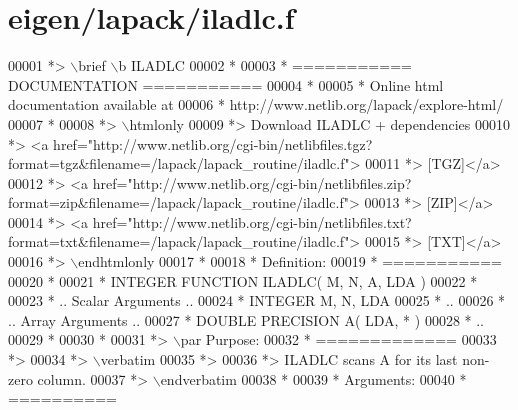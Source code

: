 \hypertarget{eigen_2lapack_2iladlc_8f_source}{}\section{eigen/lapack/iladlc.f}
\label{eigen_2lapack_2iladlc_8f_source}

\begin{DoxyCode}
00001 \textcolor{comment}{*> \(\backslash\)brief \(\backslash\)b ILADLC}
00002 \textcolor{comment}{*}
00003 \textcolor{comment}{*  =========== DOCUMENTATION ===========}
00004 \textcolor{comment}{*}
00005 \textcolor{comment}{* Online html documentation available at }
00006 \textcolor{comment}{*            http://www.netlib.org/lapack/explore-html/ }
00007 \textcolor{comment}{*}
00008 \textcolor{comment}{*> \(\backslash\)htmlonly}
00009 \textcolor{comment}{*> Download ILADLC + dependencies }
00010 \textcolor{comment}{*> <a
       href="http://www.netlib.org/cgi-bin/netlibfiles.tgz?format=tgz&filename=/lapack/lapack\_routine/iladlc.f"> }
00011 \textcolor{comment}{*> [TGZ]</a> }
00012 \textcolor{comment}{*> <a
       href="http://www.netlib.org/cgi-bin/netlibfiles.zip?format=zip&filename=/lapack/lapack\_routine/iladlc.f"> }
00013 \textcolor{comment}{*> [ZIP]</a> }
00014 \textcolor{comment}{*> <a
       href="http://www.netlib.org/cgi-bin/netlibfiles.txt?format=txt&filename=/lapack/lapack\_routine/iladlc.f"> }
00015 \textcolor{comment}{*> [TXT]</a>}
00016 \textcolor{comment}{*> \(\backslash\)endhtmlonly }
00017 \textcolor{comment}{*}
00018 \textcolor{comment}{*  Definition:}
00019 \textcolor{comment}{*  ===========}
00020 \textcolor{comment}{*}
00021 \textcolor{comment}{*       INTEGER FUNCTION ILADLC( M, N, A, LDA )}
00022 \textcolor{comment}{* }
00023 \textcolor{comment}{*       .. Scalar Arguments ..}
00024 \textcolor{comment}{*       INTEGER            M, N, LDA}
00025 \textcolor{comment}{*       ..}
00026 \textcolor{comment}{*       .. Array Arguments ..}
00027 \textcolor{comment}{*       DOUBLE PRECISION   A( LDA, * )}
00028 \textcolor{comment}{*       ..}
00029 \textcolor{comment}{*  }
00030 \textcolor{comment}{*}
00031 \textcolor{comment}{*> \(\backslash\)par Purpose:}
00032 \textcolor{comment}{*  =============}
00033 \textcolor{comment}{*>}
00034 \textcolor{comment}{*> \(\backslash\)verbatim}
00035 \textcolor{comment}{*>}
00036 \textcolor{comment}{*> ILADLC scans A for its last non-zero column.}
00037 \textcolor{comment}{*> \(\backslash\)endverbatim}
00038 \textcolor{comment}{*}
00039 \textcolor{comment}{*  Arguments:}
00040 \textcolor{comment}{*  ==========}

\end{DoxyCode}
